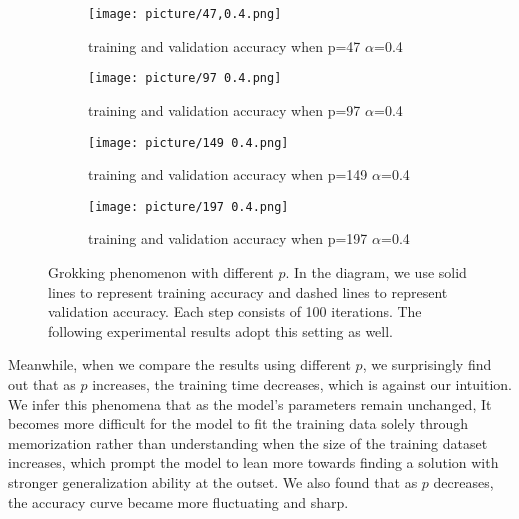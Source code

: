 \documentclass{article}
\begin{document}
\begin{figure}[htbp]
  \centering
   \begin{subfigure}[b]{0.22\textwidth}
        \centering
    \texttt{[image: picture/47,0.4.png]}
    \caption{training and validation accuracy when p=47 $\alpha$=0.4}
    \label{fig1:sub1}
  \end{subfigure}
  \hspace{0.5em} %
     \begin{subfigure}[b]{0.22\textwidth}
        \centering
    \texttt{[image: picture/97 0.4.png]}
    \caption{training and validation accuracy when p=97 $\alpha$=0.4}
    \label{fig1:sub2}
  \end{subfigure}
  \hspace{0.5em} %
     \begin{subfigure}[b]{0.22\textwidth}
        \centering
    \texttt{[image: picture/149 0.4.png]}
    \caption{training and validation accuracy when p=149 $\alpha$=0.4}
    \label{fig1:sub3}
  \end{subfigure}
  \hspace{0.5em} %
    \begin{subfigure}[b]{0.22\textwidth}
        \centering
    \texttt{[image: picture/197 0.4.png]}
    \caption{training and validation accuracy when p=197 $\alpha$=0.4}
    \label{fig1:sub4}
  \end{subfigure}
  
  \renewcommand{\figurename}{Figure}
  \caption{Grokking phenomenon with different $p$.
  In the diagram, we use solid lines to represent training accuracy and dashed lines to represent validation accuracy. Each step consists of 100 iterations. The following experimental results adopt this setting as well.}
  \label{fig1:main}
\end{figure}

\vspace{-0.5em}

Meanwhile, when we compare the results using different $p$, we surprisingly find out that as $p$ increases, the training time decreases, which is against our intuition. We infer this phenomena that as the model's parameters remain unchanged, It becomes more difficult for the model to fit the training data solely through memorization rather than understanding when the size of the training dataset increases, which prompt the model to lean more towards finding a solution with stronger generalization ability at the outset. We also found that as $p$ decreases, the accuracy curve became more fluctuating and sharp.
\end{document}

